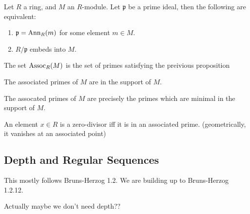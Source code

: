 \begin{proposition}
  \label{prop:assoc_primes_def_equiv}
  Let $R$ a ring, and $M$ an $R$-module.
  Let $\mathfrak{p}$ be a prime ideal, 
  then 
  the following are equivalent:
  \begin{enumerate}[label=(\roman*)]
  \item $\mathfrak{p} = \operatorname{Ann}_R (m)$ for some element $m \in M$.
  \item $R / \mathfrak{p}$ embeds into $M$.
  \end{enumerate}
\end{proposition}

\begin{definition}
  \label{def:assoc_primes}
  The set $\operatorname{Assoc}_R (M)$ is the set of
  primes satisfying the preivious proposition
\end{definition}

\begin{proposition}
  \label{prop:assoc_primes_in_support}
  The associated primes of $M$ are in the
  support of $M$.
\end{proposition}

\begin{lemma}
  \label{lem:assoc_iff_minimal_in_support}
  The assocated primes of $M$ are precisely
  the primes which are minimal in the support of $M$.
\end{lemma}


\begin{lemma}
  \label{lem:assoc_prime_zero_divisor}
  An element $x \in R$ is a zero-divisor iff
  it is in an associated prime.
  (geometrically, it vanishes at an associated point)
\end{lemma}



\subsection{Depth and Regular Sequences}

This mostly follows Bruns-Herzog 1.2.
We are building up to Bruns-Herzog 1.2.12.

Actually maybe we don't need depth??

